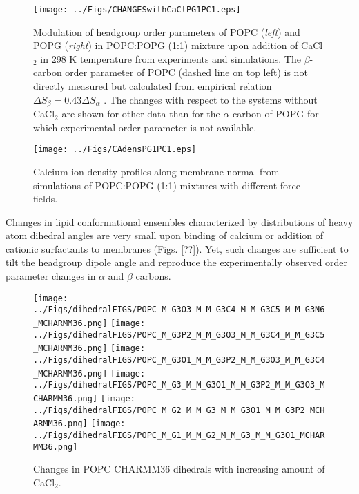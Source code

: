 \documentclass[aps,prl,superscriptaddress,twocolumn]{revtex4}
\begin{document}
\begin{figure*}[bt]
  \centering
  \texttt{[image: ../Figs/CHANGESwithCaClPG1PC1.eps]}
  \caption{\label{changesWITHCaClPG}
    Modulation of headgroup order parameters of POPC ({\it left}) and POPG ({\it right}) in POPC:POPG (1:1)
    mixture upon addition of CaCl$_2$ in 298 K temperature from experiments \cite{borle85,macdonald87} and simulations.
    The $\beta$-carbon order parameter of POPC (dashed line on top left) is not directly measured but
    calculated from empirical relation $\Delta S_{\beta}=0.43\Delta S_{\alpha}$ \cite{akutsu81}.
    The changes with respect to the systems without CaCl$_2$ are shown for other data than
    for the $\alpha$-carbon of POPG for which experimental order parameter is not available.
  }
\end{figure*}


\begin{figure}[]
  \centering
  \texttt{[image: ../Figs/CAdensPG1PC1.eps]}
  \caption{\label{CAdensPG}
    Calcium ion density profiles along membrane normal from simulations of POPC:POPG (1:1) mixtures with different force fields.
  }
\end{figure}

Changes in lipid conformational ensembles characterized by distributions of heavy atom dihedral angles
are very small upon binding of calcium or addition of cationic surfactants to membranes (Figs. \ref{??}).
Yet, such changes are sufficient to tilt the headgroup dipole angle and reproduce the experimentally observed
order parameter changes in $\alpha$ and $\beta$ carbons. 

\begin{figure}[]
  \centering
  \texttt{[image: ../Figs/dihedralFIGS/POPC\_M\_G3O3\_M\_M\_G3C4\_M\_M\_G3C5\_M\_M\_G3N6\_MCHARMM36.png]}
  \texttt{[image: ../Figs/dihedralFIGS/POPC\_M\_G3P2\_M\_M\_G3O3\_M\_M\_G3C4\_M\_M\_G3C5\_MCHARMM36.png]}
  \texttt{[image: ../Figs/dihedralFIGS/POPC\_M\_G3O1\_M\_M\_G3P2\_M\_M\_G3O3\_M\_M\_G3C4\_MCHARMM36.png]}
  \texttt{[image: ../Figs/dihedralFIGS/POPC\_M\_G3\_M\_M\_G3O1\_M\_M\_G3P2\_M\_M\_G3O3\_MCHARMM36.png]}
  \texttt{[image: ../Figs/dihedralFIGS/POPC\_M\_G2\_M\_M\_G3\_M\_M\_G3O1\_M\_M\_G3P2\_MCHARMM36.png]}
  \texttt{[image: ../Figs/dihedralFIGS/POPC\_M\_G1\_M\_M\_G2\_M\_M\_G3\_M\_M\_G3O1\_MCHARMM36.png]}  
  \caption{\label{DIHSwithCA}
    Changes in POPC CHARMM36 dihedrals with increasing amount of CaCl$_2$.
  }
\end{figure}
\end{document}
